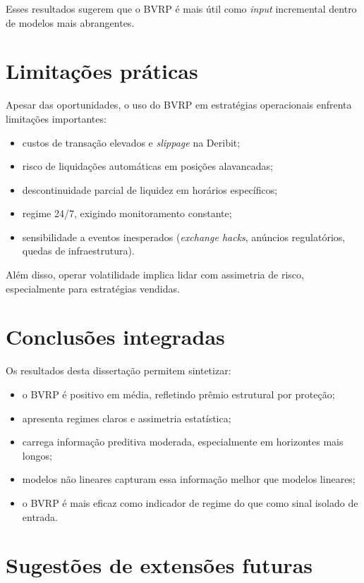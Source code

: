 Esses resultados sugerem que o BVRP é mais útil como \emph{input} incremental
dentro de modelos mais abrangentes.

\section{Limitações práticas}

Apesar das oportunidades, o uso do BVRP em estratégias operacionais enfrenta
limitações importantes:

\begin{itemize}
    \item custos de transação elevados e \textit{slippage} na Deribit;
    \item risco de liquidações automáticas em posições alavancadas;
    \item descontinuidade parcial de liquidez em horários específicos;
    \item regime 24/7, exigindo monitoramento constante;
    \item sensibilidade a eventos inesperados (\textit{exchange hacks},
          anúncios regulatórios, quedas de infraestrutura).
\end{itemize}

Além disso, operar volatilidade implica lidar com assimetria de risco,
especialmente para estratégias vendidas.

\section{Conclusões integradas}

Os resultados desta dissertação permitem sintetizar:

\begin{itemize}
    \item o BVRP é positivo em média, refletindo prêmio estrutural por proteção;
    \item apresenta regimes claros e assimetria estatística;
    \item carrega informação preditiva moderada, especialmente em horizontes mais longos;
    \item modelos não lineares capturam essa informação melhor que modelos lineares;
    \item o BVRP é mais eficaz como indicador de regime do que como sinal isolado de entrada.
\end{itemize}

\section{Sugestões de extensões futuras}

